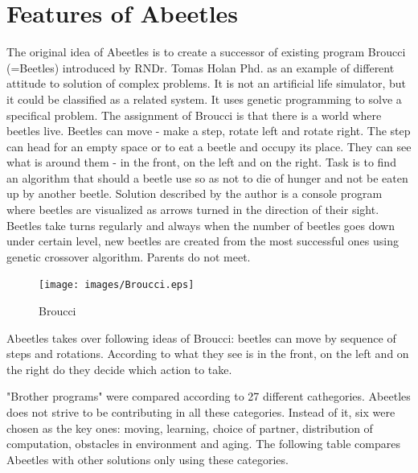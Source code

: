 \documentclass[a4paper,12pt]{report}
\begin{document}
\section{Features of Abeetles}
The original idea of Abeetles is to create a successor of existing program Broucci (=Beetles) introduced by RNDr. Tomas Holan Phd. as an example of different attitude to solution of complex problems. It is not an artificial life simulator, but it could be classified as a related system. It uses genetic programming to solve a specifical problem. The assignment of Broucci is that there is a world where beetles live. Beetles can move - make a step, rotate left and rotate right. The step can head for an empty space or to eat a beetle and occupy its place. They can see what is around them - in the front, on the left and on the right. Task is to find an algorithm that should a beetle use so as not to die of hunger and not be eaten up by another beetle. Solution described by the author is a console program where beetles are visualized as arrows turned in the direction of their sight. Beetles take turns regularly and always when the number of beetles goes down under certain level, new beetles are created from the most successful ones using genetic crossover algorithm. Parents do not meet.\cite{Broucci}

\begin{figure}
\begin{center}
  \texttt{[image: images/Broucci.eps]}
  \caption{Broucci}
  \label{img.Broucci}
\end{center}
\end{figure}

Abeetles takes over following ideas of Broucci: beetles can move by sequence of steps and rotations. According to what they see is in the front, on the left and on the right do they decide which action to take. 
 

"Brother programs" were compared according to 27 different cathegories. Abeetles does not strive to be contributing in all these categories. Instead of it, six were chosen as the key ones: moving, learning, choice of partner, distribution of computation, obstacles in environment and aging. The following table compares Abeetles with other solutions only using these categories.
\end{document}
